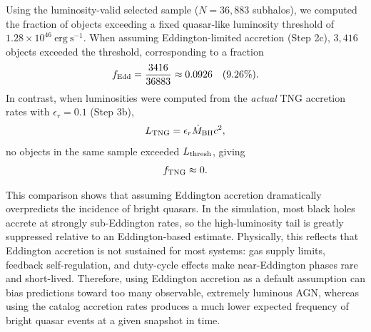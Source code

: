\documentclass[twocolumn]{aastex631}
\begin{document}
Using the luminosity-valid selected sample ($N = 36{,}883$ subhalos), we computed the fraction of
objects exceeding a fixed quasar-like luminosity threshold of $1.28\times10^{46}\ \mathrm{erg\ s^{-1}}$. When assuming Eddington-limited accretion (Step 2c), $3{,}416$ objects exceeded the threshold,
corresponding to a fraction
\begin{equation}
f_{\rm Edd} = \frac{3416}{36883} \approx 0.0926 \quad (9.26\%).
\end{equation}
In contrast, when luminosities were computed from the \textit{actual} TNG accretion rates with
$\epsilon_r=0.1$ (Step 3b),
\begin{equation}
L_{\rm TNG} = \epsilon_r \dot{M}_{\rm BH} c^2,
\end{equation}
no objects in the same sample exceeded $L_{\rm thresh}$, giving
\begin{equation}
f_{\rm TNG} \approx 0.
\end{equation}

This comparison shows that assuming Eddington accretion dramatically overpredicts the incidence of
bright quasars. In the simulation, most black holes accrete at strongly sub-Eddington rates, so the high-luminosity
tail is greatly suppressed relative to an Eddington-based estimate. Physically, this reflects that
Eddington accretion is not sustained for most systems: gas supply limits, feedback self-regulation,
and duty-cycle effects make near-Eddington phases rare and short-lived. Therefore, using Eddington
accretion as a default assumption can bias predictions toward too many observable, extremely luminous
AGN, whereas using the catalog accretion rates produces a much lower expected frequency of bright
quasar events at a given snapshot in time.


{}

\end{document}
